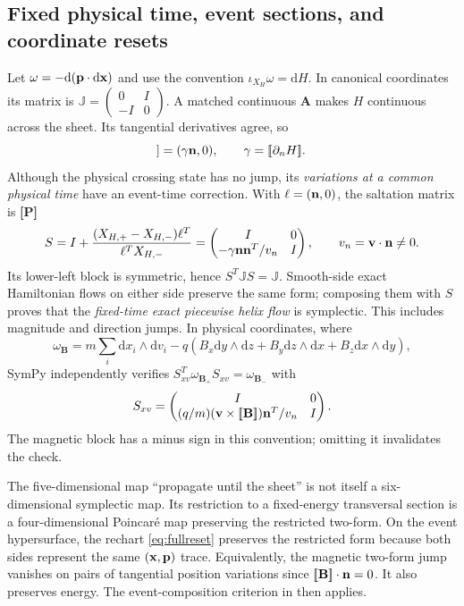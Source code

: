 \documentclass[10pt,a4paper]{article}
\newcommand{\B}{\mathbf B}\newcommand{\bunit}{\mathbf b}
\newcommand{\A}{\mathbf A}\newcommand{\dd}{\mathrm d}
\newcommand{\jump}[1]{[\![#1]\!]}
\newcommand{\proved}{\textbf{[P]}}
\begin{document}
\subsection{Fixed physical time, event sections, and coordinate resets}
Let $\omega=-\dd(\p\cdot\dd\x)$ and use the convention $\iota_{X_H}\omega=\dd H$. In canonical coordinates its matrix is $\mathbb J=\left(\begin{smallmatrix}0&I\\-I&0\end{smallmatrix}\right)$. A matched continuous $\A$ makes $H$ continuous across the sheet. Its tangential derivatives agree, so
\begin{equation}
 \jump{\nabla_{(\x,\p)}H}=(\gamma\n,0),
 \qquad\gamma=\jump{\partial_n H}.
\end{equation}
Although the physical crossing state has no jump, its \emph{variations at a common physical time} have an event-time correction. With $\ell=(\mathbf n,0)$, the saltation matrix is \proved{}
\begin{equation}\label{eq:saltation}
 S=I+\frac{(X_{H,+}-X_{H,-})\ell^T}{\ell^T X_{H,-}}
  =\begin{pmatrix}I&0\\-\gamma\mathbf n\mathbf n^T/v_n&I\end{pmatrix},
 \qquad v_n=\mathbf v\cdot\mathbf n\ne0.
\end{equation}
Its lower-left block is symmetric, hence $S^T\mathbb J S=\mathbb J$. Smooth-side exact Hamiltonian flows on either side preserve the same form; composing them with $S$ proves that the \emph{fixed-time exact piecewise helix flow} is symplectic. This includes magnitude and direction jumps. In physical coordinates, where
\begin{equation}
 \omega_{\B}=m\sum_i\dd x_i\wedge\dd v_i
 -q\left(B_x\dd y\wedge\dd z+B_y\dd z\wedge\dd x+B_z\dd x\wedge\dd y\right),
\end{equation}
SymPy independently verifies $S_{xv}^T\omega_{\B_+}S_{xv}=\omega_{\B_-}$ with
\begin{equation}
 S_{xv}=\begin{pmatrix}I&0\\
 (q/m)(\v\times\jump{\B})\n^T/v_n&I\end{pmatrix}.
\end{equation}
The magnetic block has a minus sign in this convention; omitting it invalidates the check.

The five-dimensional map ``propagate until the sheet'' is not itself a six-dimensional symplectic map. Its restriction to a fixed-energy transversal section is a four-dimensional Poincar\'e map preserving the restricted two-form. On the event hypersurface, the rechart \eqref{eq:fullreset} preserves the restricted form because both sides represent the same $(\mathbf x,\mathbf p)$ trace. Equivalently, the magnetic two-form jump vanishes on pairs of tangential position variations since $\jump{\B}\cdot\n=0$. It also preserves energy. The event-composition criterion in \cite{rejected} then applies.
\end{document}
